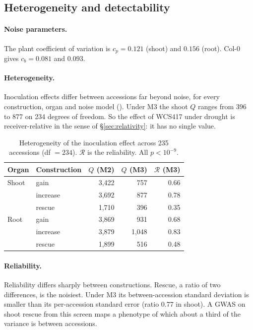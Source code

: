 \documentclass[10pt,twocolumn,a4paper]{article}
\theoremstyle{definition}
\theoremstyle{remark}
\begin{document}
\subsection{Heterogeneity and detectability}
\label{sec:res-het}

\paragraph{Noise parameters.} The plant coefficient of variation is
$c_p=0.121$ (shoot) and $0.156$ (root). Col-0 gives $c_b=0.081$ and
$0.093$.

\paragraph{Heterogeneity.} Inoculation effects differ between accessions
far beyond noise, for every construction, organ and noise model
(). Under M3 the shoot $Q$ ranges from 396 to 877 on 234
degrees of freedom. So the effect of WCS417 under drought is
receiver-relative in the sense of \S\ref{sec:relativity}: it has no
single value.

\begin{table}[t]
\centering\small
\caption{Heterogeneity of the inoculation effect across 235 accessions
(df $=234$). $\mathcal R$ is the reliability. All $p<10^{-9}$.}
\label{tab:het}
\begin{tabular}{llrrr}
\toprule
Organ & Construction & $Q$ (M2) & $Q$ (M3) & $\mathcal R$ (M3) \\
\midrule
Shoot & gain     & 3,422 & 757 & 0.66 \\
      & increase & 3,692 & 877 & 0.78 \\
      & rescue   & 1,710 & 396 & 0.35 \\
Root  & gain     & 3,869 & 931 & 0.68 \\
      & increase & 3,879 & 1,048 & 0.83 \\
      & rescue   & 1,899 & 516 & 0.48 \\
\bottomrule
\end{tabular}
\end{table}

\paragraph{Reliability.} Reliability differs sharply between
constructions. Rescue, a ratio of two differences, is the noisiest. Under
M3 its between-accession standard deviation is smaller than its
per-accession standard error (ratio 0.77 in shoot). A GWAS on shoot rescue
from this screen maps a phenotype of which about a third of the variance
is between accessions.
\end{document}
